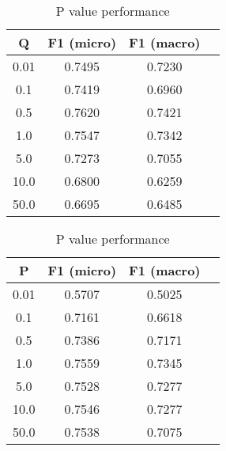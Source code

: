 \documentclass[a4paper,10pt]{article}
\begin{document}
\begin{table}[!tbp]

  \centering

  \begin{minipage}[b]{0.48\textwidth}

    \begin{tabular}{c c c c}

      \hline
      Q & F1 (micro)  & F1 (macro) \\ [0.5ex]
      \hline\hline

      0.01	& 0.7495	& 0.7230 \\ \hline
      0.1	& 0.7419	& 0.6960 \\ \hline
      0.5	& 0.7620	& 0.7421 \\ \hline
      1.0	& 0.7547	& 0.7342 \\ \hline
      5.0	& 0.7273	& 0.7055 \\ \hline
      10.0	& 0.6800	& 0.6259 \\ \hline
      50.0	& 0.6695	& 0.6485 \\ \hline

    \end{tabular}

    \caption{Q value performance}
    \label{tbl:cora:performance:q_values}

  \end{minipage}
\hfill
  \begin{minipage}[b]{0.48\textwidth}

    \begin{tabular}{c c c c}

      \hline
      P & F1 (micro)  & F1 (macro) \\ [0.5ex]
      \hline\hline

      0.01	& 0.5707	& 0.5025 \\ \hline
      0.1	& 0.7161	& 0.6618 \\ \hline
      0.5	& 0.7386	& 0.7171 \\ \hline
      1.0	& 0.7559	& 0.7345 \\ \hline
      5.0	& 0.7528	& 0.7277 \\ \hline
      10.0	& 0.7546	& 0.7277 \\ \hline
      50.0	& 0.7538	& 0.7075 \\ \hline

    \end{tabular}

    \caption{P value performance}
    \label{tbl:cora:performance:p_values}

  \end{minipage}

\end{table}
\end{document}
